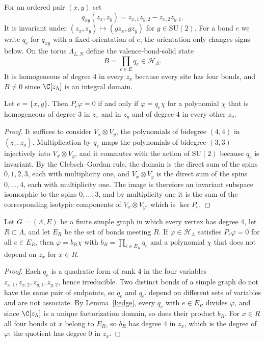 For an ordered pair $(x, y)$ set
\begin{equation*}
q_{xy}(z_x, z_y) = z_{x, 1} z_{y, 2} - z_{x, 2} z_{y, 1} .
\end{equation*}
It is invariant under $(z_x, z_y) \mapsto (g z_x, g z_y)$ for $g \in \mathrm{SU}(2)$. For a bond $e$ we write $q_e$ for $q_{xy}$ with a fixed orientation of $e$; the orientation only changes signs below. On the torus $\Lambda_{L, N}$ define the valence-bond-solid state
\begin{equation}\label{e:B}
B = \prod_{e \in E} q_e \in \mathcal H_\Lambda .
\end{equation}
It is homogeneous of degree $4$ in every $z_x$ because every site has four bonds, and $B \neq 0$ since $\C[z_\Lambda]$ is an integral domain.

\begin{lemma}\label{l:edge}
Let $e = \{x, y\}$. Then $P_e \varphi = 0$ if and only if $\varphi = q_e \chi$ for a polynomial $\chi$ that is homogeneous of degree $3$ in $z_x$ and in $z_y$ and of degree $4$ in every other $z_u$.
\end{lemma}

\begin{proof}
It suffices to consider $V_x \otimes V_y$, the polynomials of bidegree $(4, 4)$ in $(z_x, z_y)$. Multiplication by $q_e$ maps the polynomials of bidegree $(3, 3)$ injectively into $V_x \otimes V_y$, and it commutes with the action of $\mathrm{SU}(2)$ because $q_e$ is invariant. By the Clebsch--Gordan rule, the domain is the direct sum of the spins $0, 1, 2, 3$, each with multiplicity one, and $V_x \otimes V_y$ is the direct sum of the spins $0, \dots, 4$, each with multiplicity one. The image is therefore an invariant subspace isomorphic to the spins $0, \dots, 3$, and by multiplicity one it is the sum of the corresponding isotypic components of $V_x \otimes V_y$, which is $\ker P_e$.
\end{proof}

\begin{lemma}\label{l:divisibility}
Let $G = (\Lambda, E)$ be a finite simple graph in which every vertex has degree $4$, let $R \subset \Lambda$, and let $E_R$ be the set of bonds meeting $R$. If $\varphi \in \mathcal H_\Lambda$ satisfies $P_e \varphi = 0$ for all $e \in E_R$, then $\varphi = b_R \chi$ with $b_R = \prod_{e \in E_R} q_e$ and a polynomial $\chi$ that does not depend on $z_x$ for $x \in R$.
\end{lemma}

\begin{proof}
Each $q_e$ is a quadratic form of rank $4$ in the four variables $z_{x, 1}, z_{x, 2}, z_{y, 1}, z_{y, 2}$, hence irreducible. Two distinct bonds of a simple graph do not have the same pair of endpoints, so $q_e$ and $q_{e'}$ depend on different sets of variables and are not associate. By Lemma~\ref{l:edge}, every $q_e$ with $e \in E_R$ divides $\varphi$, and since $\C[z_\Lambda]$ is a unique factorization domain, so does their product $b_R$. For $x \in R$ all four bonds at $x$ belong to $E_R$, so $b_R$ has degree $4$ in $z_x$, which is the degree of $\varphi$; the quotient has degree $0$ in $z_x$.
\end{proof}

